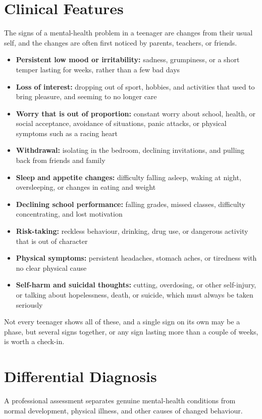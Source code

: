 \section*{Clinical Features}
The signs of a mental-health problem in a teenager are changes from their usual self, and the changes are often first noticed by parents, teachers, or friends.

\begin{itemize}
    \item \textbf{Persistent low mood or irritability:} sadness, grumpiness, or a short temper lasting for weeks, rather than a few bad days
    \item \textbf{Loss of interest:} dropping out of sport, hobbies, and activities that used to bring pleasure, and seeming to no longer care
    \item \textbf{Worry that is out of proportion:} constant worry about school, health, or social acceptance, avoidance of situations, panic attacks, or physical symptoms such as a racing heart
    \item \textbf{Withdrawal:} isolating in the bedroom, declining invitations, and pulling back from friends and family
    \item \textbf{Sleep and appetite changes:} difficulty falling asleep, waking at night, oversleeping, or changes in eating and weight
    \item \textbf{Declining school performance:} falling grades, missed classes, difficulty concentrating, and lost motivation
    \item \textbf{Risk-taking:} reckless behaviour, drinking, drug use, or dangerous activity that is out of character
    \item \textbf{Physical symptoms:} persistent headaches, stomach aches, or tiredness with no clear physical cause
    \item \textbf{Self-harm and suicidal thoughts:} cutting, overdosing, or other self-injury, or talking about hopelessness, death, or suicide, which must always be taken seriously
\end{itemize}

Not every teenager shows all of these, and a single sign on its own may be a phase, but several signs together, or any sign lasting more than a couple of weeks, is worth a check-in.

\section*{Differential Diagnosis}
A professional assessment separates genuine mental-health conditions from normal development, physical illness, and other causes of changed behaviour.

